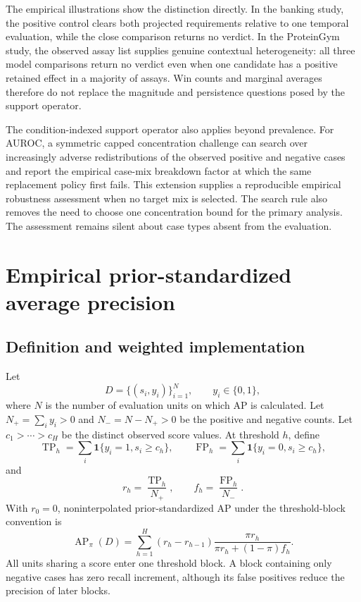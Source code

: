 \documentclass[11pt]{article}
\newcommand{\AP}{\operatorname{AP}}
\theoremstyle{remark}
\begin{document}
The empirical illustrations show the distinction directly. In the banking
study, the positive control clears both projected requirements relative to one
temporal evaluation, while the close comparison returns no verdict. In the
ProteinGym study, the observed assay list supplies genuine contextual
heterogeneity: all three model comparisons return no verdict even when one
candidate has a positive retained effect in a majority of assays. Win counts
and marginal averages therefore do not replace the magnitude and persistence
questions posed by the support operator.

The condition-indexed support operator also applies beyond prevalence. For AUROC, a symmetric capped concentration challenge can search over increasingly adverse redistributions of the observed positive and negative cases and report the empirical case-mix breakdown factor at which the same replacement policy first fails. This extension supplies a reproducible empirical robustness assessment when no target mix is selected. The search rule also removes the need to choose one concentration bound for the primary analysis. The assessment remains silent about case types absent from the evaluation.

\appendix

\section{Empirical prior-standardized average precision}
\label{app:ap}

\subsection{Definition and weighted implementation}

Let
\[
D=\{(s_i,y_i)\}_{i=1}^{N},
\qquad
y_i\in\{0,1\},
\]
where $N$ is the number of evaluation units on which AP is calculated. Let $N_+=\sum_i y_i>0$ and $N_-=N-N_+>0$ be the positive and negative counts. Let $c_1>\cdots>c_H$ be the distinct observed score values. At threshold $h$, define
\[
\operatorname{TP}_h
=
\sum_i\mathbf 1\{y_i=1,s_i\geq c_h\},
\qquad
\operatorname{FP}_h
=
\sum_i\mathbf 1\{y_i=0,s_i\geq c_h\},
\]
and
\[
r_h=\frac{\operatorname{TP}_h}{N_+},
\qquad
f_h=\frac{\operatorname{FP}_h}{N_-}.
\]
With $r_0=0$, noninterpolated prior-standardized AP under the threshold-block convention is
\begin{equation}
\AP_\pi(D)
=
\sum_{h=1}^{H}
(r_h-r_{h-1})
\frac{\pi r_h}
{\pi r_h+(1-\pi)f_h}.
\label{eq:empirical-ap}
\end{equation}
All units sharing a score enter one threshold block. A block containing only negative cases has zero recall increment, although its false positives reduce the precision of later blocks.
\end{document}
